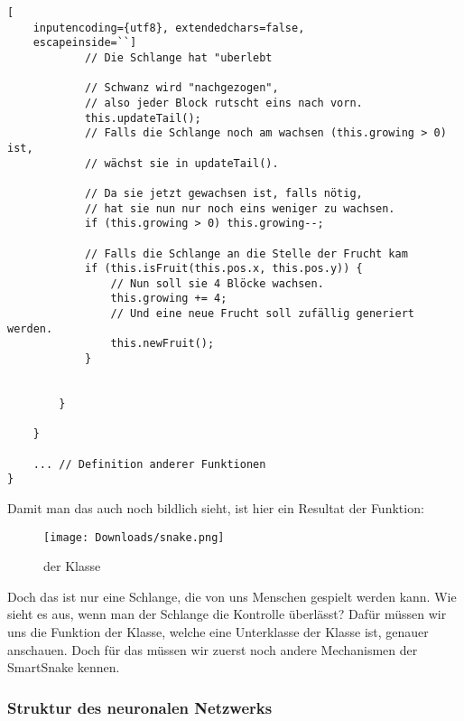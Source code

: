 \documentclass[11pt,a4paper,ngerman]{article}
\begin{document}
\begin{lstlisting}[
    inputencoding={utf8}, extendedchars=false,  
    escapeinside=``]
            // Die Schlange hat "uberlebt

            // Schwanz wird "nachgezogen", 
            // also jeder Block rutscht eins nach vorn.
            this.updateTail(); 
            // Falls die Schlange noch am wachsen (this.growing > 0) ist, 
            // wächst sie in updateTail().

            // Da sie jetzt gewachsen ist, falls nötig, 
            // hat sie nun nur noch eins weniger zu wachsen.
            if (this.growing > 0) this.growing--; 

            // Falls die Schlange an die Stelle der Frucht kam
            if (this.isFruit(this.pos.x, this.pos.y)) {
                // Nun soll sie 4 Blöcke wachsen.
                this.growing += 4; 
                // Und eine neue Frucht soll zufällig generiert werden.
                this.newFruit(); 
            }


        }

    }

    ... // Definition anderer Funktionen
}
\end{lstlisting}

Damit man das auch noch bildlich sieht, ist hier ein Resultat der  Funktion:\\

\begin{figure}[h] 
    \begin{center}
        \texttt{[image: Downloads/snake.png]}
        \caption{ der Klasse }
    \end{center}
\end{figure}

Doch das ist nur eine Schlange, die von uns Menschen gespielt werden kann. Wie sieht es aus, wenn man der Schlange die Kontrolle überlässt? Dafür müssen wir uns die  Funktion der  Klasse, welche eine Unterklasse der  Klasse ist, genauer anschauen. Doch für das müssen wir zuerst noch andere Mechanismen der SmartSnake kennen.

\subsubsection{Struktur des neuronalen Netzwerks}
\end{document}
